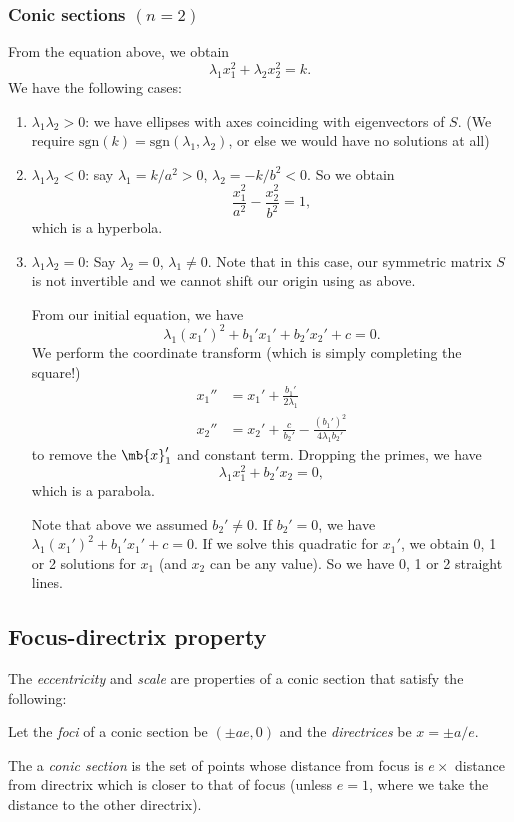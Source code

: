 \documentclass[a4paper]{article}
\begin{document}
\subsubsection{Conic sections \texorpdfstring{$(n = 2)$}{(n = 2)}}
From the equation above, we obtain
\[
\lambda_1x_1^2 + \lambda_2x_2^2 = k.
\]
We have the following cases:
\begin{enumerate}
\item $\lambda_1\lambda_2 > 0$: we have ellipses with axes coinciding with eigenvectors of $S$. (We require $\mathrm{sgn}(k) = \mathrm{sgn}(\lambda_1,\lambda_2)$, or else we would have no solutions at all)
\item $\lambda_1\lambda_2 < 0$: say $\lambda_1 = k/a^2 > 0$, $\lambda_2 = -k/b^2 < 0$. So we obtain
\[
\frac{x_1^2}{a^2} - \frac{x_2^2}{b^2} = 1,
\]
which is a hyperbola.
\item $\lambda_1\lambda_2 = 0$: Say $\lambda_2 = 0$, $\lambda_1\not= 0$. Note that in this case, our symmetric matrix $S$ is not invertible and we cannot shift our origin using as above.

From our initial equation, we have
\[
\lambda_1(x_1')^2 + b_1'x_1' + b_2' x_2' + c = 0.
\]
We perform the coordinate transform (which is simply completing the square!)
\begin{align*}
  x_1'' &= x_1' + \frac{b_1'}{2\lambda_1}\\
  x_2'' &= x_2' + \frac{c}{b_2'} - \frac{(b_1')^2}{4\lambda_1b_2'}
\end{align*}
to remove the $\mb{x}_1'$ and constant term. Dropping the primes, we have
\[
\lambda_1 x_1^2 + b_2' x_2 = 0,
\]
which is a parabola.

Note that above we assumed $b_2'\not= 0$. If $b_2' = 0$, we have $\lambda_1(x_1')^2 + b_1' x_1' + c = 0$. If we solve this quadratic for $x_1'$, we obtain 0, 1 or 2 solutions for $x_1$ (and $x_2$ can be any value). So we have 0, 1 or 2 straight lines.
\end{enumerate}

\subsection{Focus-directrix property}
\begin{defi}
  The \emph{eccentricity} and \emph{scale} are properties of a conic section that satisfy the following:

  Let the \emph{foci} of a conic section be $(\pm ae, 0)$ and the \emph{directrices} be $x = \pm a/e$.

  The a \emph{conic section} is the set of points whose distance from focus is $e \times$ distance from directrix which is closer to that of focus (unless $e = 1$, where we take the distance to the other directrix).
\end{defi}
\end{document}
